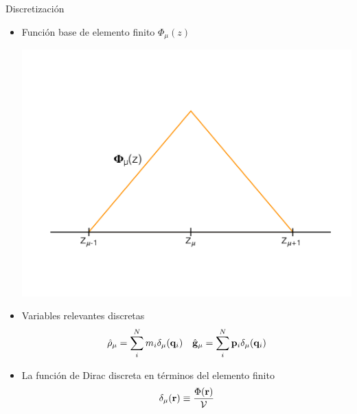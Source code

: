 \documentclass{beamer}
\begin{document}
\begin{frame}{Discretización}
  \begin{itemize}
    \item<1-> Función base de elemento finito $\Phi_{\mu}(z)$
    \begin{center} 
      \includegraphics[width = 0.5\linewidth]{psichi-defensa}
    \end{center}
  \item<2-> Variables relevantes discretas
\begin{align}
  \hat{\rho}_\mu= \sum_i^Nm_i\delta_\mu({\bf q}_i) &&
\hat{\bf g}_\mu= \sum_i^N{\bf p}_i\delta_\mu({\bf q}_i)
\nonumber
\end{align}
\item<3-> La función de Dirac discreta en términos del elemento finito
  \begin{align}
    \delta_{\mu}({\bf r}) \equiv \frac{\Phi({\bf r})}{{\cal V}}
    \nonumber
  \end{align}
\end{itemize}

\end{frame}
\end{document}
